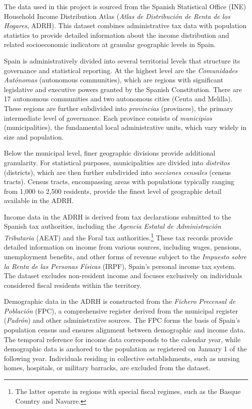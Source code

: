 
The data used in this project is sourced from the Spanish Statistical Office (INE) Household Income Distribution Atlas (\textit{Atlas de Distribución de Renta de los Hogares}, ADRH). This dataset combines administrative tax data with population statistics to provide detailed information about the income distribution and related socioeconomic indicators at granular geographic levels in Spain.

Spain is administratively divided into several territorial levels that structure its governance and statistical reporting. At the highest level are the \textit{Comunidades Autónomas} (autonomous communities), which are regions with significant legislative and executive powers granted by the Spanish Constitution. There are 17 autonomous communities and two autonomous cities (Ceuta and Melilla). These regions are further subdivided into \textit{provincias} (provinces), the primary intermediate level of governance. Each province consists of \textit{municipios} (municipalities), the fundamental local administrative units, which vary widely in size and population.

Below the municipal level, finer geographic divisions provide additional granularity. For statistical purposes, municipalities are divided into \textit{distritos} (districts), which are then further subdivided into \textit{secciones censales} (census tracts). Census tracts, encompassing areas with populations typically ranging from 1,000 to 2,500 residents, provide the finest level of geographic detail available in the ADRH.

Income data in the ADRH is derived from tax declarations submitted to the Spanish tax authorities, including the \textit{Agencia Estatal de Administración Tributaria} (AEAT) and the Foral tax authorities.\footnote{The latter operate in regions with special fiscal regimes, such as the Basque Country and Navarre.} These tax records provide detailed information on income from various sources, including wages, pensions, unemployment benefits, and other forms of revenue subject to the \textit{Impuesto sobre la Renta de las Personas Físicas} (IRPF), Spain's personal income tax system. The dataset excludes non-resident income and focuses exclusively on individuals considered fiscal residents within the territory.

Demographic data in the ADRH is constructed from the \textit{Fichero Precensal de Población} (FPC), a comprehensive register derived from the municipal register (\textit{Padrón}) and other administrative sources. The FPC forms the basis of Spain’s population census and ensures alignment between demographic and income data. The temporal reference for income data corresponds to the calendar year, while demographic data is anchored to the population as registered on January 1 of the following year. Individuals residing in collective establishments, such as nursing homes, hospitals, or military barracks, are excluded from the dataset.

